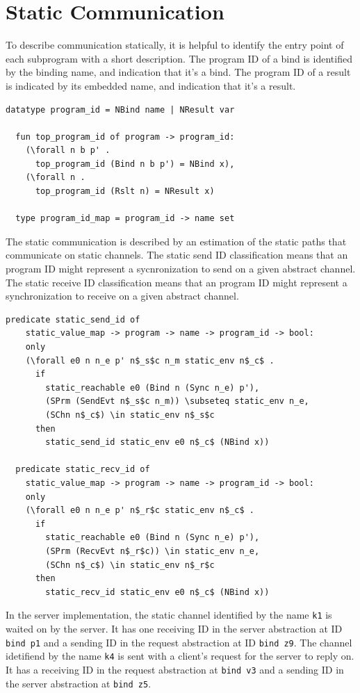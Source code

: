 \documentclass[10pt]{article}
\begin{document}
\section{Static Communication}
To describe communication statically, it is helpful to identify the entry
point of each subprogram with a short description. The program ID of a bind is
identified by the binding name, and indication that it's a bind. The program ID
of a result is indicated by its embedded name, and indication that it's a result.

\begin{lstlisting}[language=logic, mathescape]
  datatype program_id = NBind name | NResult var

  fun top_program_id of program -> program_id:
    (\forall n b p' . 
      top_program_id (Bind n b p') = NBind x),
    (\forall n . 
      top_program_id (Rslt n) = NResult x)

  type program_id_map = program_id -> name set

\end{lstlisting}

The static communication is described by an estimation of the static paths that communicate on
static channels.
The static send ID classification means that an program ID might represent a
sycnronization to send on a given abstract channel.
The static receive ID classification means that an program ID might represent a
synchronization to receive on a given abstract channel. 

\begin{lstlisting}[language=logic, mathescape]
  predicate static_send_id of
    static_value_map -> program -> name -> program_id -> bool:
    only
    (\forall e0 n n_e p' n$_s$c n_m static_env n$_c$ .
      if
        static_reachable e0 (Bind n (Sync n_e) p'),
        (SPrm (SendEvt n$_s$c n_m)) \subseteq static_env n_e, 
        (SChn n$_c$) \in static_env n$_s$c
      then
        static_send_id static_env e0 n$_c$ (NBind x))

  predicate static_recv_id of
    static_value_map -> program -> name -> program_id -> bool:
    only
    (\forall e0 n n_e p' n$_r$c static_env n$_c$ .
      if
        static_reachable e0 (Bind n (Sync n_e) p'),
        (SPrm (RecvEvt n$_r$c)) \in static_env n_e, 
        (SChn n$_c$) \in static_env n$_r$c 
      then
        static_recv_id static_env e0 n$_c$ (NBind x))
  \end{lstlisting}


In the server implementation, the static channel identified by the name \lstinline{k1} is waited on
by the server.  It has
one receiving ID in the server abstraction
at ID \lstinline[language=sugar_lang]{bind p1} and a sending ID
in the request abstraction at ID \lstinline[language=sugar_lang]{bind z9}.
The channel idetifiend by the name \lstinline{k4} is sent with a client's request for
the server to reply on. It has a receiving ID in the request abstraction at
\lstinline[language=sugar_lang]{bind v3} and a sending ID in the server abstraction at
\lstinline[language=sugar_lang]{bind z5}.
\end{document}
